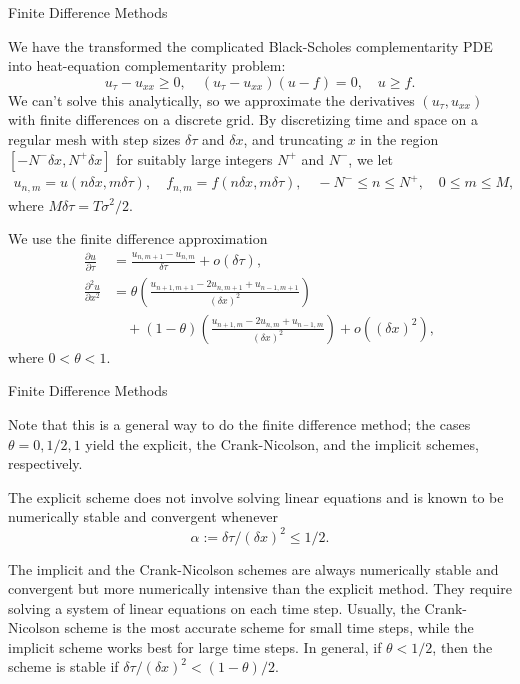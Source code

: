 \documentclass{beamer}
\begin{document}
\begin{frame}{Finite Difference Methods}

    {\footnotesize \footnotesize
    We have the transformed the complicated Black-Scholes complementarity PDE
    into  heat-equation complementarity problem:
    \[
    u_\tau - u_{xx} \geq 0, \quad (u_\tau - u_{xx})(u - f) = 0, \quad u \geq f.
    \]
    \pause  We can't solve this analytically,
    so we approximate the derivatives $(u_\tau, u_{xx})$ with finite differences on a discrete grid.
    By discretizing time and space on a regular mesh with step sizes $\delta \tau$ and $\delta x$, 
    and truncating $x$ 
    in the region $[-N^- \delta x, N^+ \delta x]$ for suitably large integers $N^+$ and $N^-$, we let
    \begin{align*}
    u_{n,m} = u(n\delta x, m\delta \tau), \quad f_{n,m} = f(n\delta x, m\delta \tau), \quad
    -N^- \leq n \leq N^+, \quad 0 \leq m \leq M,
    \end{align*}
    where $M\delta \tau = T\sigma^2/2$.
    \par  \pause We use the finite difference approximation
    {\footnotesize \tiny
    \begin{align*}
    \frac{\partial u}{\partial \tau} &= \frac{u_{n,m+1} - u_{n,m}}{\delta \tau} + o(\delta \tau), \\
    \frac{\partial^2 u}{\partial x^2} &= \theta \left( \frac{u_{n+1,m+1} - 2u_{n,m+1} + u_{n-1,m+1}}{(\delta x)^2} \right) \\
    &\quad + (1 - \theta) \left( \frac{u_{n+1,m} - 2u_{n,m} + u_{n-1,m}}{(\delta x)^2} \right) + o((\delta x)^2),
    \end{align*}
    }
    where $0 < \theta < 1$.  
        }
    
    
\end{frame}

\begin{frame}{Finite Difference Methods}

    {\footnotesize \footnotesize

    Note that this is a general way to do the finite difference method;
     the cases $\theta = 0, 1/2, 1$ yield the explicit, the Crank-Nicolson, and the implicit schemes, respectively.
    \vspace{1em}

    The explicit scheme does not involve solving linear equations and is known
    to be numerically stable and convergent whenever
    \[
    \alpha := \delta \tau / (\delta x)^2 \leq 1/2.
    \]

     \pause The implicit and the Crank-Nicolson schemes are always numerically stable and convergent 
    but more numerically intensive than the explicit method. They require solving a system of 
    linear equations on each time step. Usually, the Crank-Nicolson scheme is the most accurate 
    scheme for small time steps, while the implicit scheme works best for large time steps. In general, 
    if $\theta < 1/2$, then the scheme is stable if $\delta \tau / (\delta x)^2 < (1 - \theta)/2$.
    }
    
    
\end{frame}
\end{document}
